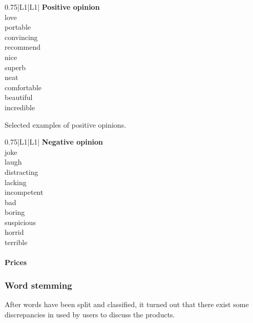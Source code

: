         \begin{table}[H]
          \begin{subtable}{0.49\textwidth}
            \centering
            \begin{tabularx}{0.75\textwidth}{|L{1}|L{1}|} \hline
               \textbf{Positive opinion} \\\hline
              love \\
              portable \\
              convincing \\
              recommend \\
              nice \\
              superb \\
              neat \\
              comfortable \\
              beautiful \\
              incredible \\
              \hline
            \end{tabularx}
            \caption{Selected examples of positive opinions.}
            \label{tab:positiveopinionsexamples}
          \end{subtable}
          \begin{subtable}{0.49\textwidth}
            \centering
            \begin{tabularx}{0.75\textwidth}{|L{1}|L{1}|} \hline
               \textbf{Negative opinion} \\\hline
              joke \\
              laugh \\
              distracting \\
              lacking \\
              incompetent \\
              bad \\
              boring \\
              suspicious \\
              horrid \\
              terrible \\
              \hline
            \end{tabularx}
            \caption{Selected examples of negative opinions.}
            \label{tab:negativeopinionsexamples}
          \end{subtable}
        \end{table}

      \paragraph{Prices}

    \subsubsection{Word stemming}
    
      After words have been split and classified, it turned out that there exist some discrepancies in  used by users to discuss the products.
